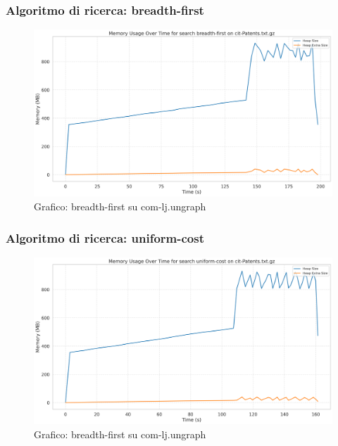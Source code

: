 \documentclass{article}
\begin{document}
\subsubsection{Algoritmo di ricerca: breadth-first}
\begin{figure}[h]\centering
	\includegraphics[width=\textwidth]{../plots/cit-Patents_breadth-first.png}
	\caption{Grafico: breadth-first su com-lj.ungraph}
\end{figure}
\subsubsection{Algoritmo di ricerca: uniform-cost}
\begin{figure}[h]\centering
	\includegraphics[width=\textwidth]{../plots/cit-Patents_uniform-cost.png}
	\caption{Grafico: breadth-first su com-lj.ungraph}
\end{figure}
\end{document}
